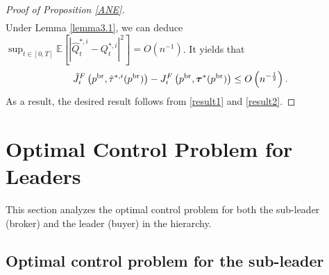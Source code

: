 \documentclass[11pt]{article}
\numberwithin{equation}{section}
\begin{document}
\begin{proof}[Proof of Proposition \ref{ANE}]
\begin{align}
\end{align}
Under Lemma \ref{lemma3.1}, we can deduce
$\sup_{t\in [0,T]}\mathbb{E}\left[|\hat{Q}_t^{*,i}-Q_t^{*,i}|^2\right]=O(n^{-1})$. It yields that
\begin{align}\label{result2}
\tilde{J}_i^F\left(p^{{\rm br}}, \hat{\tau}^{*,i}(p^{{\rm br}})\right)-J_i^F\left(p^{{\rm br}},\boldsymbol{\tau}^*(p^{{\rm br}})\right)\leq O\left(n^{-\frac{1}{2}}\right).
\end{align}
As a result, the desired result follows from \eqref{result1} and \eqref{result2}.
\end{proof}

\section{Optimal Control Problem for Leaders}\label{sec:4}

This section analyzes the optimal control problem for both the sub-leader (broker) and the leader (buyer) in the hierarchy.

\subsection{Optimal control problem for the sub-leader}	
\end{document}
